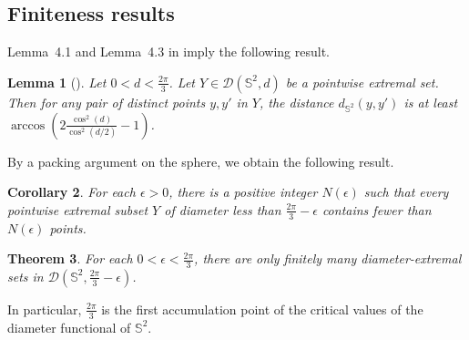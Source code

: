 \documentclass[12pt]{amsart}
\theoremstyle{plain}
\newtheorem{theorem}{Theorem}[section]
\newtheorem{corollary}[theorem]{Corollary}
\newtheorem{lemma}[theorem]{Lemma}
\newcommand{\Sp}{\mathbb{S}}
\numberwithin{equation}{section}
\begin{document}
\subsection{Finiteness results}


Lemma~4.1 and Lemma~4.3 in \cite{katz1989diameter} imply the following
result.

\begin{lemma}[{\cite{katz1989diameter}}]
Let $0<d<\frac{2\pi}{3}$.  Let $Y\in \mathcal D(\Sp^2, d)$ be a
pointwise extremal set.  Then for any pair of distinct points $y, y'$
in $Y$, the distance $d_{\Sp^2}(y, y')$ is at least $\arccos\left(
2\frac{\cos^2(d)}{\cos^2(d/2)}-1\right)$.
\end{lemma}

By a packing argument on the sphere, we obtain the following result.

\begin{corollary}
\label{coro:upper_bound_on_points_in_pointwise_extremal_set}
For each $\epsilon>0$, there is a positive integer $N(\epsilon)$ such
that every pointwise extremal subset $Y$ of diameter less than
$\frac{2\pi}{3}-\epsilon$ contains fewer than $N(\epsilon)$ points.
\end{corollary}

\begin{theorem}\label{thm:finiteness_of_minimal_configurations}
For each $0< \epsilon < \frac{2\pi}{3}$, there are only finitely many
diameter-extremal sets in $\mathcal{D}(\Sp^2, \frac{2\pi}{3}-\epsilon)$.
\end{theorem}
In particular, $\frac{2\pi}{3}$ is the first accumulation point of the critical values of the diameter functional
  of $\Sp^2$.
\end{document}
